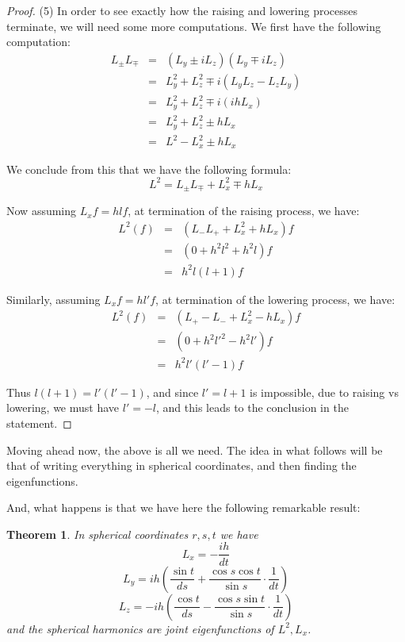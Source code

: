 \documentclass[12pt]{amsbook}
\newtheorem{theorem}{Theorem}[chapter]
\begin{document}
\begin{proof}
(5) In order to see exactly how the raising and lowering processes terminate, we will need some more computations. We first have the following computation:
\begin{eqnarray*}
L_\pm L_\mp
&=&(L_y\pm iL_z)(L_y\mp iL_z)\\
&=&L_y^2+L_z^2\mp i(L_yL_z-L_zL_y)\\
&=&L_y^2+L_z^2\mp i(ihL_x)\\
&=&L_y^2+L_z^2\pm hL_x\\
&=&L^2-L_x^2\pm hL_x
\end{eqnarray*}

We conclude from this that we have the following formula:
$$L^2=L_\pm L_\mp+L_x^2\mp hL_x$$

Now assuming $L_xf=hlf$, at termination of the raising process, we have:
\begin{eqnarray*}
L^2(f)
&=&(L_-L_++L_x^2+hL_x)f\\
&=&(0+h^2l^2+h^2l)f\\
&=&h^2l(l+1)f
\end{eqnarray*}

Similarly, assuming $L_xf=hl'f$, at termination of the lowering process, we have:
\begin{eqnarray*}
L^2(f)
&=&(L_+-L_-+L_x^2-hL_x)f\\
&=&(0+h^2l'^2-h^2l')f\\
&=&h^2l'(l'-1)f
\end{eqnarray*}

Thus $l(l+1)=l'(l'-1)$, and since $l'=l+1$ is impossible, due to raising vs lowering, we must have $l'=-l$, and this leads to the conclusion in the statement.
\end{proof}

Moving ahead now, the above is all we need. The idea in what follows will be that of writing everything in spherical coordinates, and then finding the eigenfunctions. 

\bigskip

And, what happens is that we have here the following remarkable result:


\begin{theorem}
In spherical coordinates $r,s,t$ we have
$$L_x=-\frac{ih}{dt}$$
$$L_y=ih\left(\frac{\sin t}{ds}+\frac{\cos s\cos t}{\sin s}\cdot\frac{1}{dt}\right)$$
$$L_z=-ih\left(\frac{\cos t}{ds}-\frac{\cos s\sin t}{\sin s}\cdot\frac{1}{dt}\right)$$
and the spherical harmonics are joint eigenfunctions of $L^2,L_x$.
\end{theorem}
\end{document}
